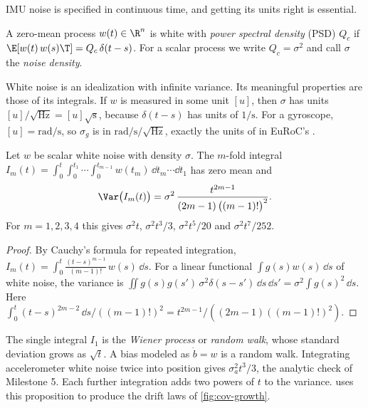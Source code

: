 IMU noise is specified in continuous time, and getting its units right is essential.

\begin{definition}
A zero-mean process $w(t) \in \R^n$ is white with \emph{power spectral density} (PSD) $Q_c$ if
$\E[w(t)\,w(s)\T] = Q_c\,\delta(t - s)$. For a scalar process we write $Q_c = \sigma^2$ and call
$\sigma$ the \emph{noise density}.
\end{definition}

White noise is an idealization with infinite variance. Its meaningful properties are those of its
integrals. If $w$ is measured in some unit $[u]$, then $\sigma$ has units $[u]/\sqrt{\mathrm{Hz}}
= [u]\sqrt{\mathrm{s}}$, because $\delta(t-s)$ has units of $1/\mathrm{s}$. For a gyroscope,
$[u] = \mathrm{rad/s}$, so $\sigma_g$ is in $\mathrm{rad/s/\sqrt{Hz}}$, exactly the units of
 in EuRoC's .

\begin{proposition}
\label{prop:integrated-noise}
Let $w$ be scalar white noise with density $\sigma$. The $m$-fold integral
$I_m(t) = \int_0^t \int_0^{t_1}\cdots\int_0^{t_{m-1}} w(t_m)\,\dd t_m \cdots \dd t_1$ has zero mean and
\begin{equation}
  \Var\big(I_m(t)\big) = \sigma^2\,\frac{t^{2m-1}}{(2m-1)\,\big((m-1)!\big)^2}.
  \label{eq:integrated-noise}
\end{equation}
For $m = 1,2,3,4$ this gives $\sigma^2 t$, $\sigma^2 t^3/3$, $\sigma^2 t^5/20$ and $\sigma^2 t^7/252$.
\end{proposition}
\begin{proof}
By Cauchy's formula for repeated integration, $I_m(t) = \int_0^t \frac{(t - s)^{m-1}}{(m-1)!}\,w(s)\,\dd s$.
For a linear functional $\int g(s)w(s)\,\dd s$ of white noise, the variance is
$\iint g(s)g(s')\,\sigma^2\delta(s - s')\,\dd s\,\dd s' = \sigma^2\int g(s)^2\,\dd s$. Here
$\int_0^t (t-s)^{2m-2}\,\dd s/((m-1)!)^2 = t^{2m-1}/((2m-1)((m-1)!)^2)$.
\end{proof}

The single integral $I_1$ is the \emph{Wiener process} or \emph{random walk}, whose standard deviation
grows as $\sqrt t$. A bias modeled as $\dot b = w$ is a random walk. Integrating accelerometer white
noise twice into position gives $\sigma_a^2 t^3/3$, the analytic check of Milestone 5. Each further
integration adds two powers of $t$ to the variance.  uses this proposition to
produce the drift laws of \cref{fig:cov-growth}.

